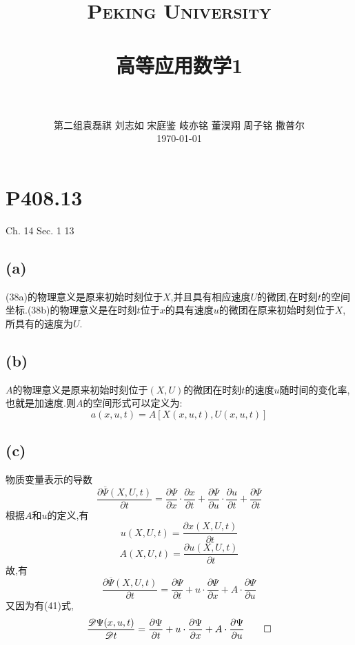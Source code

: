 \documentclass[12pt]{article}
\title{
		\vspace{-1in} 	
		\usefont{OT1}{bch}{b}{n}
		\normalfont \normalsize \textsc{\LARGE Peking University}\\[1cm] %
		\horrule{0.5pt} \\[0.5cm]
		\huge \bfseries{高等应用数学1} \\
		\horrule{2pt} \\[0.5cm]
}
\author{
		\normalfont 								\normalsize
		第二组\quad 袁磊祺 \quad 刘志如 \quad 宋庭鉴 \quad 岐亦铭 \quad 董淏翔 \quad 周子铭 \quad 撒普尔\\	\normalsize
        \today
}
\date{}
\begin{document}
% 

\maketitle

\section{P408.13}

Ch. 14 Sec. 1 13

\subsection{(a)}

(38a)的物理意义是原来初始时刻位于$X$,并且具有相应速度$U$的微团,在时刻$t$的空间坐标.(38b)的物理意义是在时刻$t$位于$x$的具有速度$u$的微团在原来初始时刻位于$X$,所具有的速度为$U$.

\subsection{(b)}

$A$的物理意义是原来初始时刻位于$(X,U)$的微团在时刻$t$的速度$u$随时间的变化率,也就是加速度.则$A$的空间形式可以定义为:
\begin{equation}
	a(x,u,t)=A[X(x,u,t), U(x,u,t)]
\end{equation}

\subsection{(c)}
物质变量表示的导数
\begin{equation}
	\frac{\partial\overline\Psi(X,U,t)}{\partial t} = \frac{\partial\Psi}{\partial x}\cdot\frac{\partial x}{\partial t} + \frac{\partial\Psi}{\partial u}\cdot\frac{\partial u}{\partial t} + \frac{\partial\Psi}{\partial t}
\end{equation}
根据$A$和$u$的定义,有
\begin{equation}
	u(X,U,t) = \frac{\partial x(X,U,t)}{\partial t}
\end{equation}
\begin{equation}
	A(X,U,t) = \frac{\partial u(X,U,t)}{\partial t}
\end{equation}
故,有
\begin{equation}
	\frac{\partial\overline\Psi(X,U,t)}{\partial t} =
\frac{\partial\Psi}{\partial t} + u\cdot\frac{\partial\Psi}{\partial x} + A\cdot\frac{\partial\Psi}{\partial u}
\end{equation}
又因为有(41)式,
\begin{equation}
	\frac{\mathscr{D}\Psi(x,u,t)}{\mathscr{D} t} =
\frac{\partial\Psi}{\partial t} + u\cdot\frac{\partial\Psi}{\partial x} + A\cdot\frac{\partial\Psi}{\partial u}\qed
\end{equation}
\end{document}
